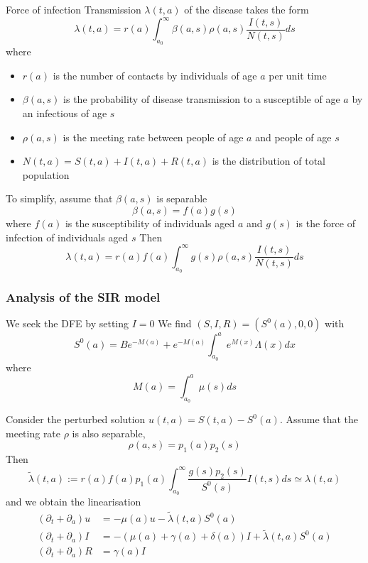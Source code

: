 \documentclass[aspectratio=169]{beamer}\usepackage[]{graphicx}\usepackage[]{xcolor}
\begin{document}
\begin{frame}{Force of infection}
Transmission $\lambda(t,a)$ of the disease takes the form
\[
\lambda(t,a)=r(a)\int_{a_0}^\infty \beta(a,s)\rho(a,s)
\frac{I(t,s)}{N(t,s)}ds
\]
where 
\begin{itemize}
\item $r(a)$ is the number of contacts by individuals of age $a$ per unit time
\item $\beta(a,s)$ is the probability of disease transmission to a susceptible of age $a$ by an infectious of age $s$
\item $\rho(a,s)$ is the meeting rate between people of age $a$ and people of age $s$
\item $N(t,a)=S(t,a)+I(t,a)+R(t,a)$ is the distribution of total population
\end{itemize}
\end{frame}


\begin{frame}
To simplify, assume that $\beta(a,s)$ is separable
\[
\beta(a,s)=f(a)g(s)
\]
where $f(a)$ is the susceptibility of individuals aged $a$ and $g(s)$ is the force of infection of individuals aged $s$
\vfill
Then
\begin{equation}\label{eq:beta_age_dep}
\lambda(t,a)=r(a)f(a)\int_{a_0}^\infty g(s)\rho(a,s)
\frac{I(t,s)}{N(t,s)}ds
\end{equation}
\end{frame}

\begin{frame}\frametitle{Analysis of the SIR model}
We seek the DFE by setting $I=0$
\vfill
We find $(S,I,R)=(S^0(a),0,0)$ with
\[
S^0(a)=Be^{-M(a)} +e^{-M(a)}\int_{a_0}^a e^{M(x)}\Lambda(x)dx
\]
where
\[
M(a)=\int_{a_0}^a \mu(s)ds
\]
\end{frame}


\begin{frame}
Consider the perturbed solution $u(t,a)=S(t,a)-S^0(a)$. Assume that the meeting rate $\rho$ is also separable,
\[
\rho(a,s)=p_1(a)p_2(s)
\]
Then
\[
\tilde\lambda(t,a):=r(a)f(a)p_1(a)\int_{a_0}^\infty
\frac{g(s)p_2(s)}{S^0(s)}I(t,s) ds \simeq \lambda(t,a)
\]
and we obtain the linearisation
\begin{align*}
(\partial_t+\partial_a)u&=-\mu(a)u-\tilde\lambda(t,a)S^0(a) \\
(\partial_t+\partial_a)I&=-(\mu(a)+\gamma(a)+\delta(a))I
+\tilde\lambda(t,a)S^0(a) \\
(\partial_t+\partial_a)R&=\gamma(a)I
\end{align*}
\end{frame}
\end{document}
